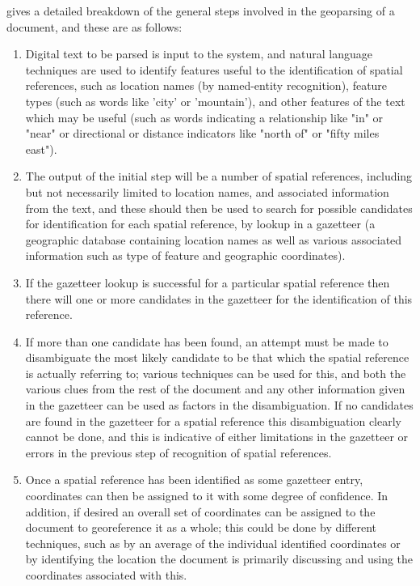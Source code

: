\documentclass[12pt, a4paper]{report}
\begin{document}
\citet{hill2006} gives a detailed breakdown of the general steps involved in the geoparsing of a document, and these are as follows:

\begin{enumerate}
	\item {Digital text to be parsed is input to the system, and natural language techniques are used to identify features useful to the identification of spatial references, such as location names (by named-entity recognition), feature types (such as words like 'city' or 'mountain'), and other features of the text which may be useful (such as words indicating a relationship like "in" or "near" or directional or distance indicators like "north of" or "fifty miles east").}
	\item {The output of the initial step will be a number of spatial references, including but not necessarily limited to location names, and associated information from the text, and these should then be used to search for possible candidates for identification for each spatial reference, by lookup in a gazetteer (a geographic database containing location names as well as various associated information such as type of feature and geographic coordinates).}
	\item {If the gazetteer lookup is successful for a particular spatial reference then there will one or more candidates in the gazetteer for the identification of this reference.}
	\item {If more than one candidate has been found, an attempt must be made to disambiguate the most likely candidate to be that which the spatial reference is actually referring to; various techniques can be used for this, and both the various clues from the rest of the document and any other information given in the gazetteer can be used as factors in the disambiguation. If no candidates are found in the gazetteer for a spatial reference this disambiguation clearly cannot be done, and this is indicative of either limitations in the gazetteer or errors in the previous step of recognition of spatial references.}
	\item {Once a spatial reference has been identified as some gazetteer entry, coordinates can then be assigned to it with some degree of confidence. In addition, if desired an overall set of coordinates can be assigned to the document to georeference it as a whole; this could be done by different techniques, such as by an average of the individual identified coordinates or by identifying the location the document is primarily discussing and using the coordinates associated with this.}
\end{enumerate}
\end{document}

